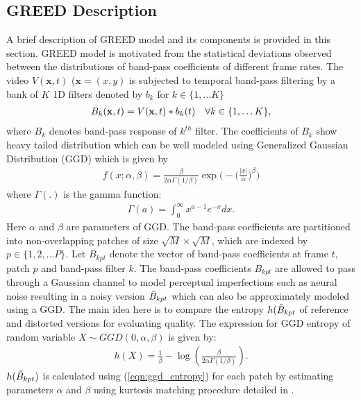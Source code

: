 \documentclass[conference]{IEEEtran}
\begin{document}
\subsection{GREED Description}
A brief description of GREED \cite{madhusudana2020stgreed} model and its components is provided in this section. GREED model is motivated from the statistical deviations observed between the distributions of band-pass coefficients of different frame rates. The video $V(\mathbf{x},t)$ ($\mathbf{x} = (x,y)$ is subjected to temporal band-pass filtering by a bank of $K$ 1D filters denoted by $b_k$ for $k \in \{1,\ldots K\}$
\begin{align}
    B_k(\mathbf{x},t) = V(\mathbf{x},t)*b_k(t) \text{\hspace{10pt}} \forall k \in \{1,\ldots K\},
\end{align}
where $B_k$ denotes band-pass response of $k^{th}$ filter. The coefficients of $B_k$ show heavy tailed distribution which can be well modeled using Generalized Gaussian Distribution (GGD) which is given by
\begin{align*}
    f(x;\alpha,\beta) = \frac{\beta}{2\alpha\Gamma(1/\beta)}\exp\Big(-\Big(\frac{|x|}{\alpha}\Big)^{\beta}\Big)
\end{align*}
where $\Gamma(.)$ is the gamma function:
\begin{align*}
    \Gamma(a) = \int_0 ^{\infty}x^{a-1}e^{-x} dx .
\end{align*}
Here $\alpha$ and $\beta$ are parameters of GGD. The band-pass coefficients are partitioned into non-overlapping patches of size $\sqrt{M} \times \sqrt{M}$, which are indexed by $p \in \{ 1,2, \ldots P \}$. Let $B_{kpt}$ denote the vector of band-pass coefficients at frame $t$, patch $p$ and band-pass filter $k$. The band-pass coefficients $B_{kpt}$ are allowed to pass through a Gaussian channel to model perceptual imperfections such as neural noise \cite{sheikh2006image,soundararajan2012video} resulting in a noisy version $\Tilde{B}_{kpt}$ which can also be approximately modeled using a GGD. The main idea here is to compare the entropy $h(\Tilde{B}_{kpt}$ of reference and distorted versions for evaluating quality. The expression for GGD entropy of random variable $X \sim GGD(0,\alpha,\beta)$ is given by:
\begin{align}
    h(X) = \frac{1}{\beta} - \log \left(\frac{\beta}{2\alpha\Gamma(1/\beta) }\right).
    \label{eqn:ggd_entropy}
\end{align}
$h(\Tilde{B}_{kpt})$ is calculated using (\ref{eqn:ggd_entropy}) for each patch by estimating parameters $\alpha$ and $\beta$ using kurtosis matching procedure detailed in \cite{soury2015new,pan2012exposing}.
\end{document}
